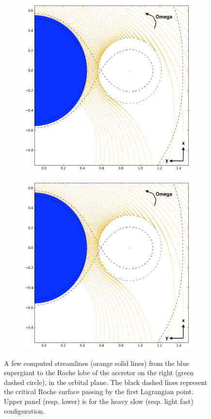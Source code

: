\documentclass{aa}
\begin{document}
\begin{figure}
\begin{subfigure}{.5\textwidth}
\centering
\includegraphics[width=0.99\columnwidth]{Pictures/big_picture.png}
  \label{fig:sfig1}
\end{subfigure}
\begin{subfigure}{.5\textwidth}
\centering
\includegraphics[width=0.99\columnwidth]{Pictures/big_picture.png}
  \label{fig:sfig2}
\end{subfigure}
\caption{A few computed streamlines (orange solid lines) from the blue supergiant to the Roche lobe of the accretor on the right (green dashed circle), in the orbital plane. The black dashed lines represent the critical Roche surface passing by the first Lagrangian point. Upper panel (resp. lower) is for the heavy slow (resp. light fast) configuration.}
\label{fig:big_picture}
\end{figure} 
\end{document}
